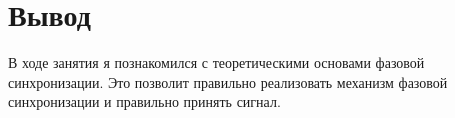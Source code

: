 \chapter{Вывод}
\label{ch:chap3}

В ходе занятия я познакомился с теоретическими основами фазовой синхронизации. Это позволит правильно реализовать механизм фазовой синхронизации
и правильно принять сигнал.
\endinput